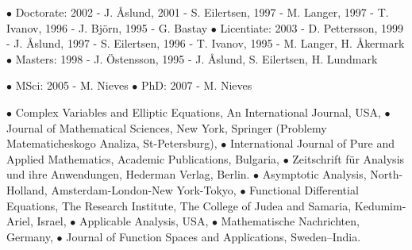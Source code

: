 \documentclass{article}
\begin{document}
\medskip

$\bullet$ Doctorate: 
              2002 - J. {\AA}slund, 
              2001 - S. Eilertsen, 
              1997 - M. Langer, 
              1997 - T. Ivanov, 
              1996 - J. Bj\"orn,
              1995 - G. Bastay
$\bullet$ Licentiate: 
2003 - D. Pettersson,
1999 - J. {\AA}slund,
              1997 - S. Eilertsen,
              1996 - T. Ivanov,
              1995 - M. Langer, H.
{\AA}kermark
   $\bullet$ Masters: 
             1998 - J. {\"O}stensson,
              1995 - J. {\AA}slund, S.
Eilertsen, H. Lundmark

\medskip


\medskip
$\bullet$ MSci: 
            2005 - M. Nieves
$\bullet$ PhD: 
            2007 - M. Nieves            


 
   \medskip
  
     $\bullet$ Complex Variables and Elliptic Equations,  An International Journal, USA, 
      $\bullet$ Journal of Mathematical Sciences, New York, Springer 
       (Problemy Matematicheskogo Analiza, St-Petersburg), 
      $\bullet$ International Journal of Pure and Applied Mathematics, Academic Publications, Bulgaria, 
        $\bullet$ Zeitschrift f{\"u}r Analysis und
ihre Anwendungen, Hederman Verlag,  Berlin. 
     $\bullet$ Asymptotic Analysis,
North-Holland, Amsterdam-London-New York-Tokyo, 
        $\bullet$ Functional Differential Equations,
The Research Institute, The 
  College of Judea and Samaria, Kedumim-Ariel, Israel, 
        $\bullet$ Applicable Analysis, USA, 
       $\bullet$ Mathematische Nachrichten, Germany, 
         $\bullet$ Journal of Function Spaces and
Applications, Sweden--India.

 
  
\end{document}
